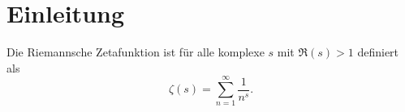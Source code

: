 \section{Einleitung} \label{zeta:section:einleitung}

Die Riemannsche Zetafunktion ist für alle komplexe $s$ mit $\Re(s) > 1$ definiert als
\begin{equation}\label{zeta:equation1}
    \zeta(s)
    =
    \sum_{n=1}^{\infty}
    \frac{1}{n^s}.
\end{equation}

